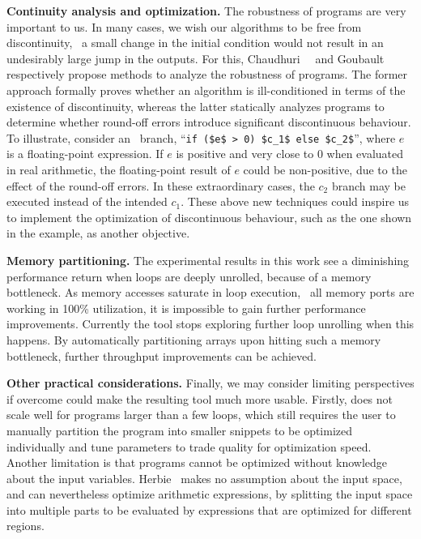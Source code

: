 \textbf{Continuity analysis and optimization.} The robustness of programs
are very important to us.  In many cases, we wish our algorithms to be
free from discontinuity, \ie~a small change in the initial condition
would not result in an undesirably large jump in the outputs.  For this,
Chaudhuri~\etal~\cite{chaudhuri11} and Goubault~\etal~\cite{goubault13}
respectively propose methods to analyze the robustness of programs.  The
former approach formally proves whether an algorithm is ill-conditioned
in terms of the existence of discontinuity, whereas the latter statically
analyzes programs to determine whether round-off errors introduce significant
discontinuous behaviour.  To illustrate, consider an \iflit~branch,
``\lstinline[basicstyle=\tt]{if ($e$ > 0) $c_1$ else $c_2$}'', where $e$
is a floating-point expression.  If $e$ is positive and very close to
$0$ when evaluated in real arithmetic, the floating-point result of $e$
could be non-positive, due to the effect of the round-off errors.  In
these extraordinary cases, the $c_2$ branch may be executed instead of the
intended $c_1$.  These above new techniques could inspire us to implement the
optimization of discontinuous behaviour, such as the one shown in the example,
as another objective.

\textbf{Memory partitioning.} The experimental results in this work see a
diminishing performance return when loops are deeply unrolled, because of a
memory bottleneck.  As memory accesses saturate in loop execution, \ie~all
memory ports are working in 100\% utilization, it is impossible to gain further
performance improvements.  Currently the tool stops exploring further loop
unrolling when this happens.  By automatically partitioning arrays upon hitting
such a memory bottleneck, further throughput improvements can be achieved.

\textbf{Other practical considerations.}  Finally, we may consider limiting
perspectives if overcome could make the resulting tool much more usable.
Firstly, \soap{} does not scale well for programs larger than a few loops,
which still requires the user to manually partition the program into smaller
snippets to be optimized individually and tune parameters to trade quality for
optimization speed.  Another limitation is that programs cannot be optimized
without knowledge about the input variables.  Herbie~\cite{panchekha15} makes
no assumption about the input space, and can nevertheless optimize arithmetic
expressions, by splitting the input space into multiple parts to be evaluated
by expressions that are optimized for different regions.



